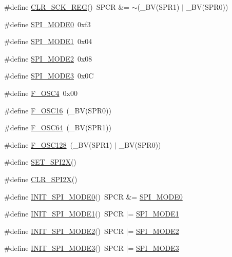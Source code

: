 \begin{DoxyCompactItemize}
\item 
\#define \hyperlink{a00015_a097c5a5487596c1cf42604e333d2ad85}{C\-L\-R\-\_\-\-S\-C\-K\-\_\-\-R\-E\-G}()~S\-P\-C\-R \&= $\sim$(\-\_\-\-B\-V(S\-P\-R1) $\vert$ \-\_\-\-B\-V(S\-P\-R0))
\item 
\#define \hyperlink{a00015_ac9d0bde2b42b2403d00b7a611514b006}{S\-P\-I\-\_\-\-M\-O\-D\-E0}~0xf3
\item 
\#define \hyperlink{a00015_a9481b7327b91aa52ff5f70eb2d0acc95}{S\-P\-I\-\_\-\-M\-O\-D\-E1}~0x04
\item 
\#define \hyperlink{a00015_a991dec04d2fb38979cfb0d9fc7f8b026}{S\-P\-I\-\_\-\-M\-O\-D\-E2}~0x08
\item 
\#define \hyperlink{a00015_a5f928a2445070981765ee0416c12369d}{S\-P\-I\-\_\-\-M\-O\-D\-E3}~0x0\-C
\item 
\#define \hyperlink{a00015_a84c3487449731c99a94404295ec0afd1}{F\-\_\-\-O\-S\-C4}~0x00
\item 
\#define \hyperlink{a00015_a8607d7b5f457a1262e37c1524e167307}{F\-\_\-\-O\-S\-C16}~(\-\_\-\-B\-V(S\-P\-R0))
\item 
\#define \hyperlink{a00015_af02ef796ffe33130d3eb8b5c5c179be2}{F\-\_\-\-O\-S\-C64}~(\-\_\-\-B\-V(S\-P\-R1))
\item 
\#define \hyperlink{a00015_aa5f93a54b5b4b4d84f318346f19eff90}{F\-\_\-\-O\-S\-C128}~(\-\_\-\-B\-V(S\-P\-R1) $\vert$ \-\_\-\-B\-V(S\-P\-R0))
\item 
\#define \hyperlink{a00015_adffdf11322e7b104b910a841b7de2b11}{S\-E\-T\-\_\-\-S\-P\-I2\-X}()
\item 
\#define \hyperlink{a00015_a6e8a4b0dc3d3b8c65459e751af8424a4}{C\-L\-R\-\_\-\-S\-P\-I2\-X}()
\item 
\#define \hyperlink{a00015_a9bed579a9d8b21a8d7170d27fbe3e11d}{I\-N\-I\-T\-\_\-\-S\-P\-I\-\_\-\-M\-O\-D\-E0}()~S\-P\-C\-R \&= \hyperlink{a00015_ac9d0bde2b42b2403d00b7a611514b006}{S\-P\-I\-\_\-\-M\-O\-D\-E0}
\item 
\#define \hyperlink{a00015_a75c77e8553a5178154cf62b7d8bb2fbf}{I\-N\-I\-T\-\_\-\-S\-P\-I\-\_\-\-M\-O\-D\-E1}()~S\-P\-C\-R $\vert$= \hyperlink{a00015_a9481b7327b91aa52ff5f70eb2d0acc95}{S\-P\-I\-\_\-\-M\-O\-D\-E1}
\item 
\#define \hyperlink{a00015_a0e07670f4c262a8e9cab546c8fddee41}{I\-N\-I\-T\-\_\-\-S\-P\-I\-\_\-\-M\-O\-D\-E2}()~S\-P\-C\-R $\vert$= \hyperlink{a00015_a991dec04d2fb38979cfb0d9fc7f8b026}{S\-P\-I\-\_\-\-M\-O\-D\-E2}
\item 
\#define \hyperlink{a00015_a647266dd624e52be3d0acbb69d0a2d14}{I\-N\-I\-T\-\_\-\-S\-P\-I\-\_\-\-M\-O\-D\-E3}()~S\-P\-C\-R $\vert$= \hyperlink{a00015_a5f928a2445070981765ee0416c12369d}{S\-P\-I\-\_\-\-M\-O\-D\-E3}

\end{DoxyCompactItemize}
